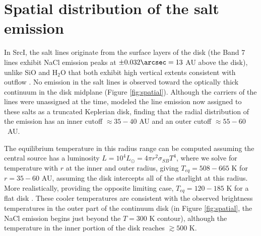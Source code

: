 \documentclass[12pt]{article}
\newcommand{\sourcei}{SrcI\xspace}
\newcommand{\lsun}{\ensuremath{L_{\odot}}\xspace}			%
\newcommand{\water}{H$_{2}$O\xspace}		%
\begin{document}
\section{Spatial distribution of the salt emission}
\label{sec:wherefrom}
In \sourcei, the salt lines originate from the surface layers of the disk (the Band 7
lines exhibit NaCl emission peaks at $\pm0.032\arcsec=13$ AU above the disk),
unlike SiO and \water that both exhibit high vertical extents consistent with
outflow \cite{Ginsburg2018b}.  No emission in the salt lines is observed
toward the optically thick continuum in the disk midplane (Figure
\ref{fig:spatial}).  Although the carriers of the lines were unassigned at the
time, \cite{Ginsburg2018b} modeled the line emission now assigned to these
salts as a
truncated Keplerian disk, finding that the radial distribution of the emission
has an inner cutoff $\approx35-40$ AU and an outer cutoff $\approx55-60$~AU.

The equilibrium temperature in this radius range can be computed assuming the central
source has a luminosity $L=10^4 \lsun = 4 \pi r^2 \sigma_{SB} T^4 $, where we
solve for temperature with $r$ at the inner and outer radius, giving $T_{eq} =
508-665$ K for $r=35-60$ AU, assuming the disk intercepts all of the starlight 
at this radius.  More realistically, providing the opposite limiting case,
$T_{eq}=120-185$ K for a flat disk \cite{Chiang1997a}.  These cooler temperatures
are consistent with the observed brightness temperatures in the outer
part of the continuum disk (in Figure \ref{fig:spatial}, the NaCl emission
begins just beyond the $T=300$ K contour), although the temperature in the inner
portion of the disk reaches $\gtrsim500$ K.
\end{document}
